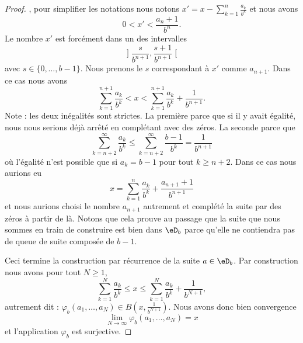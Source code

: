 \begin{proof}
        , pour simplifier les notations nous notons \( x'=x-\sum_{k=1}^{n}\frac{ a_k }{ b^k }\) et nous avons
        \begin{equation}
            0<x'<\frac{ a_n+1 }{ b^n }.
        \end{equation}
        Le nombre \( x'\) est forcément dans un des intervalles
        \begin{equation}
                \mathopen] \frac{ s }{ b^{n+1} } , \frac{ s+1 }{ b^{n+1} } \mathclose[
        \end{equation}
        avec \( s\in\{ 0,\ldots, b-1 \}\). Nous prenons le \( s\) correspondant à \( x'\) comme \( a_{n+1}\). Dans ce cas nous avons
        \begin{equation}
            \sum_{k=1}^{n+1}\frac{ a_k }{ b^k }< x<\sum_{k=1}^{n+1}\frac{ a_k }{ b^k }+\frac{1}{ b^{n+1} }.
        \end{equation}
        Note : les deux inégalités sont strictes. La première parce que si il y avait égalité, nous nous serions déjà arrêté en complétant avec des zéros. La seconde parce que
        \begin{equation}
            \sum_{k=n+2}^{\infty}\frac{ a_k }{ b^k }\leq \sum_{k=n+2}^{\infty}\frac{ b-1 }{ b^k }=\frac{1}{ b^{n+1} }
        \end{equation}
        où l'égalité n'est possible que si \( a_k=b-1\) pour tout \( k\geq n+2\). Dans ce cas nous aurions eu
        \begin{equation}
            x=\sum_{k=1}^{n}\frac{ a_k }{ b^k }+\frac{ a_{n+1}+1 }{ b^{n+1} }
        \end{equation}
        et nous aurions choisi le nombre \( a_{n+1}\) autrement et complété la suite par des zéros à partir de là. Notons que cela prouve au passage que la suite que nous sommes en train de construire est bien dans \( \eD_b\) parce qu'elle ne contiendra pas de queue de suite composée de \( b-1\).

        Ceci termine la construction par récurrence de la suite \( a\in \eD_b\). Par construction nous avons pour tout \( N\geq 1\),
        \begin{equation}
            \sum_{k=1}^N\frac{ a_k }{ b^k }\leq x\leq \sum_{k=1}^N\frac{ a_k }{ b^k }+\frac{1}{ b^{N+1} },
        \end{equation}
        autrement dit : \( \varphi_b(a_1,\ldots, a_N)\in B(x,\frac{1}{ b^{N+1} })\). Nous avons donc bien convergence
        \begin{equation}
            \lim_{N\to \infty} \varphi_b(a_1,\ldots, a_N)=x
        \end{equation}
        et l'application \( \varphi_b\) est surjective.
\end{proof}

